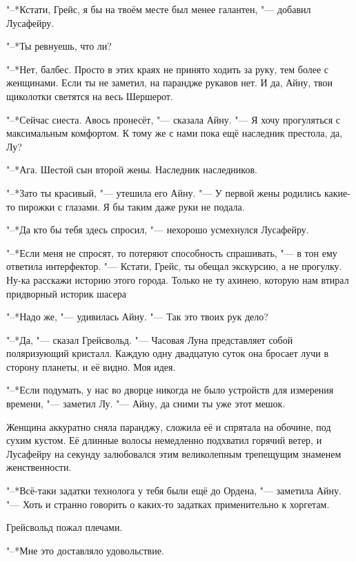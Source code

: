 "--*Кстати, Грейс, я бы на твоём месте был менее галантен, "--- добавил Лусафейру.

"--*Ты ревнуешь, что ли?

"--*Нет, балбес.
Просто в этих краях не принято ходить за руку, тем более с женщинами.
Если ты не заметил, на парандже рукавов нет.
И да, Айну, твои щиколотки светятся на весь Шершерот.

"--*Сейчас сиеста.
Авось пронесёт, "--- сказала Айну.
"--- Я хочу прогуляться с максимальным комфортом.
К тому же с нами пока ещё наследник престола, да, Лу?

"--*Ага.
Шестой сын второй жены.
Наследник наследников.

"--*Зато ты красивый, "--- утешила его Айну.
"--- У первой жены родились какие-то пирожки с глазами.
Я бы таким даже руки не подала.

"--*Да кто бы тебя здесь спросил, "--- нехорошо усмехнулся Лусафейру.

"--*Если меня не спросят, то потеряют способность спрашивать, "--- в тон ему ответила интерфектор.
"--- Кстати, Грейс, ты обещал экскурсию, а не прогулку.
Ну-ка расскажи историю этого города.
Только не ту ахинею, которую нам втирал придворный историк шасера\footnotemark\ldotst
{}

\spacing

"--*Надо же, "--- удивилась Айну.
"--- Так это твоих рук дело?

"--*Да, "--- сказал Грейсвольд.
"--- Часовая Луна представляет собой поляризующий кристалл.
Каждую одну двадцатую суток она бросает лучи в сторону планеты, и её видно.
Моя идея.

"--*Если подумать, у нас во дворце никогда не было устройств для измерения времени, "--- заметил Лу.
"--- Айну, да сними ты уже этот мешок.

Женщина аккуратно сняла паранджу, сложила её и спрятала на обочине, под сухим кустом.
Её длинные волосы немедленно подхватил горячий ветер, и Лусафейру на секунду залюбовался этим великолепным трепещущим знаменем женственности.

"--*Всё-таки задатки технолога у тебя были ещё до Ордена, "--- заметила Айну.
"--- Хоть и странно говорить о каких-то задатках применительно к хоргетам.

Грейсвольд пожал плечами.

"--*Мне это доставляло удовольствие.

